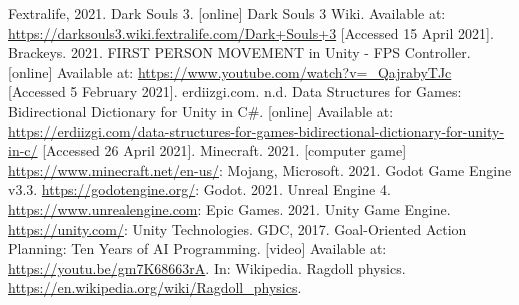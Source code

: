\documentclass[11pt]{report}
\begin{document}
\begin{thebibliography}{}
    Fextralife, 2021. Dark Souls 3. [online] Dark Souls 3 Wiki. Available at: \url{https://darksouls3.wiki.fextralife.com/Dark+Souls+3} [Accessed 15 April 2021]. 
    Brackeys. 2021. FIRST PERSON MOVEMENT in Unity - FPS Controller. [online] Available at: \url{https://www.youtube.com/watch?v=_QajrabyTJc} [Accessed 5 February 2021].
    erdiizgi.com. n.d. Data Structures for Games: Bidirectional Dictionary for Unity in C\#. [online] Available at: \url{https://erdiizgi.com/data-structures-for-games-bidirectional-dictionary-for-unity-in-c/} [Accessed 26 April 2021].
    Minecraft. 2021. [computer game] \url{https://www.minecraft.net/en-us/}: Mojang, Microsoft.
    2021. Godot Game Engine v3.3. \url{https://godotengine.org/}: Godot.
    2021. Unreal Engine 4. \url{https://www.unrealengine.com}: Epic Games.
    2021. Unity Game Engine. \url{https://unity.com/}: Unity Technologies.
    GDC, 2017. Goal-Oriented Action Planning: Ten Years of AI Programming. [video] Available at: \url{https://youtu.be/gm7K68663rA}.
    In: Wikipedia. Ragdoll physics. \url{https://en.wikipedia.org/wiki/Ragdoll_physics}.
\end{thebibliography}
\end{document}
